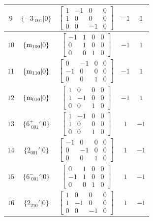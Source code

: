 \documentclass[fleqn,8pt]{jsarticle}
\begin{document}
\begin{longtable}{ccccc}
$ 9 $ & $ \{-3^{-}_{\,\,001}|0\} $ & $ \begin{bmatrix} 1 & -1 & 0 & 0 \\ 1 & 0 & 0 & 0 \\ 0 & 0 & -1 & 0 \end{bmatrix} $ & $ -1 $ & $ 1 $ \\ \hline
$ 10 $ & $ \{{\rm m}_{100}|0\} $ & $ \begin{bmatrix} -1 & 1 & 0 & 0 \\ 0 & 1 & 0 & 0 \\ 0 & 0 & 1 & 0 \end{bmatrix} $ & $ -1 $ & $ 1 $ \\ \hline
$ 11 $ & $ \{{\rm m}_{110}|0\} $ & $ \begin{bmatrix} 0 & -1 & 0 & 0 \\ -1 & 0 & 0 & 0 \\ 0 & 0 & 1 & 0 \end{bmatrix} $ & $ -1 $ & $ 1 $ \\ \hline
$ 12 $ & $ \{{\rm m}_{010}|0\} $ & $ \begin{bmatrix} 1 & 0 & 0 & 0 \\ 1 & -1 & 0 & 0 \\ 0 & 0 & 1 & 0 \end{bmatrix} $ & $ -1 $ & $ 1 $ \\ \hline
$ 13 $ & $ \{6^{+}_{\,\,001}{}'|0\} $ & $ \begin{bmatrix} 1 & -1 & 0 & 0 \\ 1 & 0 & 0 & 0 \\ 0 & 0 & 1 & 0 \end{bmatrix} $ & $ 1 $ & $ -1 $ \\ \hline
$ 14 $ & $ \{2{}_{001}{}'|0\} $ & $ \begin{bmatrix} -1 & 0 & 0 & 0 \\ 0 & -1 & 0 & 0 \\ 0 & 0 & 1 & 0 \end{bmatrix} $ & $ 1 $ & $ -1 $ \\ \hline
$ 15 $ & $ \{6^{-}_{\,\,001}{}'|0\} $ & $ \begin{bmatrix} 0 & 1 & 0 & 0 \\ -1 & 1 & 0 & 0 \\ 0 & 0 & 1 & 0 \end{bmatrix} $ & $ 1 $ & $ -1 $ \\ \hline
$ 16 $ & $ \{2{}_{210}{}'|0\} $ & $ \begin{bmatrix} 1 & 0 & 0 & 0 \\ 1 & -1 & 0 & 0 \\ 0 & 0 & -1 & 0 \end{bmatrix} $ & $ 1 $ & $ -1 $ \\ \hline

\end{longtable}
\end{document}
